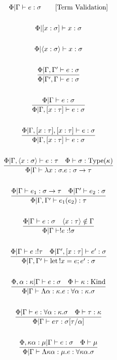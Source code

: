 \documentclass {article}
\begin{document}
\begin{gather*}
\Phi | \Gamma \vdash e : \sigma \tag* {[\text{Term Validation}]}  \\
\\
\Phi | [x : \sigma] \vdash x : \sigma \\
\\
\Phi | \langle x : \sigma \rangle \vdash x : \sigma \\
\\
\frac
{\Phi | \Gamma, \Gamma' \vdash e : \sigma}
{\Phi | \Gamma', \Gamma \vdash e : \sigma} \\
\\
\frac
{\Phi | \Gamma \vdash e : \sigma}
{\Phi | \Gamma, [ x : \tau ] \vdash e : \sigma } \\
\\
\frac
{\Phi | \Gamma, [x : \tau], [x : \tau] \vdash e : \sigma}
{\Phi | \Gamma, [x : \tau] \vdash e : \sigma } \\
\\
\frac
{\Phi | \Gamma, \langle x : \sigma \rangle \vdash e : \tau \quad \Phi \vdash \sigma : \text{Type} (\kappa)}
{\Phi | \Gamma \vdash \lambda x:\sigma. e : \sigma \to \tau } \\
\\
\frac
{\Phi | \Gamma \vdash e_1 : \sigma \to \tau \quad \Phi | \Gamma' \vdash e_2 : \sigma}
{\Phi | \Gamma, \Gamma' \vdash e_1(e_2) : \tau} \\
\\
\frac
{\Phi | \Gamma \vdash e : \sigma \quad \langle x : \tau \rangle \notin \Gamma }
{\Phi | \Gamma \vdash !e : !\sigma } \\
\\
\frac
{\Phi | \Gamma \vdash e : !\tau \quad \Phi | \Gamma', [x : \tau] \vdash e' : \sigma }
{\Phi | \Gamma, \Gamma' \vdash \text{let} \, !x = e; e' : \sigma}  \\
\\
\frac
{\Phi, \alpha : \kappa | \Gamma \vdash e : \sigma \quad \Phi \vdash \kappa : \text{Kind}}
{\Phi | \Gamma \vdash \Lambda \alpha : \kappa. e : \forall \alpha : \kappa. \sigma } \\
\\
\frac
{\Phi | \Gamma \vdash e : \forall \alpha : \kappa. \sigma \quad \Phi \vdash \tau : \kappa }
{\Phi | \Gamma \vdash e \tau : \sigma [\tau/\alpha] } \\
\\
\frac
{\Phi, \kappa \alpha : \mu | \Gamma \vdash e : \sigma \quad \Phi \vdash \mu}
{\Phi | \Gamma \vdash \Lambda \kappa \alpha : \mu. e : \forall \kappa \alpha. \sigma} \\

\end{gather*}
\end{document}
